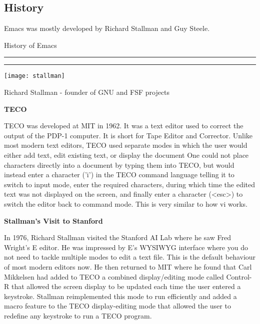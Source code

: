 \subsection{History}

Emacs was mostly developed by Richard Stallman and Guy Steele.

\begin{table*}[h!]
\caption{History of Emacs}
\centering
\begin{minipage}[t]{.7\linewidth}
\color{gray}
\rule{\linewidth}{1pt}
\bigskip
\rule{\linewidth}{1pt}
\end{minipage}
\end{table*}

\begin{marginfigure}
  \texttt{[image: stallman]}
  \caption{Richard Stallman - founder of GNU and FSF projects}
\end{marginfigure}

\textbf{TECO}

TECO was developed at MIT in 1962. It was a text editor
used to correct the output of the PDP-1 computer.
It is short for Tape Editor and Corrector.
Unlike most modern text editors,
TECO used separate modes in which the user would either
add text, edit existing text, or display the document
One could not place characters directly into a document
by typing them into TECO, but would instead enter a
character ('i') in the TECO command language telling
it to switch to input mode, enter the required characters,
during which time the edited text was not displayed on
the screen, and finally enter a character (<esc>) to
switch the editor back to command mode. This is very
similar to how vi works.

\textbf{Stallman's Visit to Stanford}

In 1976, Richard Stallman visited the Stanford AI Lab
where he saw Fred Wright's E editor. He was impressed
by E's WYSIWYG
interface where you do not need to tackle multiple
modes to edit a text file. This is the default behaviour
of most modern editors now.
He then returned to MIT where he found that
Carl Mikkelsen had added to TECO a combined
display/editing mode called Control-R that allowed
the screen display to be updated each time the user
entered a keystroke. Stallman reimplemented this mode
to run efficiently and added a macro feature to the TECO
display-editing mode that allowed the user to redefine
any keystroke to run a TECO program.

